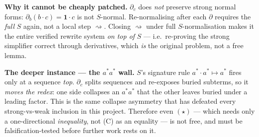 \documentclass[11pt]{article}
\newcommand{\der}{\partial}
\newcommand{\rw}{\rightsquigarrow}
\newcommand{\one}{\mathbf{1}}
\begin{document}
\textbf{Why it cannot be cheaply patched.}
$\der_c$ does \emph{not} preserve strong normal forms: $\der_b(b\!\cdot\! c)=\one\!\cdot\! c$ is not $S$-normal.
Re-normalising after each $\der$ requires the \emph{full} $S$ again, not a local step $\rw$.
Closing $\rw$ under full $S$-normalisation makes it the entire verified rewrite system \emph{on top of} $S$ —
i.e.\ re-proving the strong simplifier correct through derivatives, which \emph{is} the original problem, not a free lemma.

\textbf{The deeper instance — the $a^{*}a^{*}$ wall.}
$S$'s signature rule $a^{*}\!\cdot\! a^{*}\mapsto a^{*}$ fires only at a sequence \emph{top}.
$\der_c$ splits sequences and re-exposes buried subterms, so it \emph{moves the redex}:
one side collapses an $a^{*}a^{*}$ that the other leaves buried under a leading factor.
This is the same collapse asymmetry that has defeated every strong-vs-weak inclusion in this project.
Therefore even $(\star)$ — which needs only a one-directional \emph{inequality}, not (C) as an equality —
is not free, and must be falsification-tested before further work rests on it.
\end{document}
